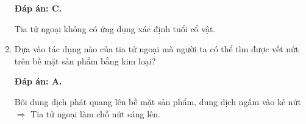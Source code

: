 \begin{enumerate}[label=\bfseries Câu \arabic*:]
{
	}
	
	\loigiai
	{		\textbf{Đáp án: C.}
		
		Tia tử ngoại không có ứng dụng xác định tuổi cổ vật.
	}
		\item {} 
	\cauhoi
	{Dựa vào tác dụng nào của tia tử ngoại mà người ta có thể tìm được vết nứt trên bề mặt sản phẩm bằng kim loại?
		
	}
	
	\loigiai
	{		\textbf{Đáp án: A.}
		
		Bôi dung dịch phát quang lên bề mặt sản phẩm, dung dịch ngấm vào kẻ nứt $\Rightarrow$ Tia tử ngoại làm chỗ nứt sáng lên. 
	}

\end{enumerate}

